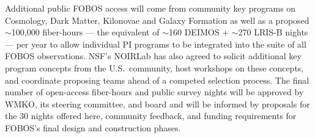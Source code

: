 \documentclass[oneside,11pt]{amsart}
\newcommand{\arcmin}{\mbox{$^{\prime}$}}
\DeclareRobustCommand{\lesssim}{%
\mathrel{\hskip-.5em\begin{array}{c}<\\[-8pt]\sim\end{array}\hskip-.5em}}
\begin{document}
Additional public FOBOS access will come from community key programs on Cosmology, Dark Matter, Kilonovae and Galaxy Formation as well as a proposed $\sim$100,000 fiber-hours --- the equivalent of
$\sim$160 DEIMOS $+$ $\sim$270 LRIS-B nights --- per year to allow individual PI programs to be integrated into the
suite of all FOBOS observations.  NSF's NOIRLab has also agreed to solicit additional key program concepts from the
U.S.\ community, host workshops on these concepts, and coordinate proposing teams ahead of a competed selection
process.  The final number of open-access fiber-hours and public survey nights will be approved by WMKO, its
steering committee, and board and will be informed by proposals for the 30 nights offered here, community feedback, and funding requirements for FOBOS's final design and construction phases.


\end{document}
